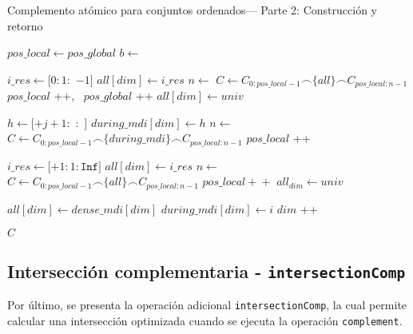 \begin{algorithm}
\caption{Complemento atómico para conjuntos ordenados— Parte 2: Construcción y retorno}\label{alg:complementAtom-part2}
\begin{algorithmic}[1]
    \State $pos\_local \gets pos\_global$
    \State $b \gets$ 


      \State $i\_res \gets [0:1:$ $-1]$
        \State $all[dim] \gets i\_res$
        \State $n \gets$ 
        \State $C \gets C_{0:pos\_local - 1} \frown \{all\} \frown C_{pos\_local:n - 1}$
        \State $pos\_local$ \!+\!+, \, $pos\_global$ \!+\!+
        \State $all[dim] \gets univ$
      \EndIf
    \EndIf

            \State $h \gets [$$ + j + 1 : $ $: $ $]$
              \State $during\_mdi[dim] \gets h$
              \State $n \gets$ 
              \State $C \gets C_{0: pos\_local - 1} \frown \{during\_mdi\} \frown C_{pos\_local:n - 1}$
              \State $pos\_local$ \!+\!+
            \EndIf
          \EndFor
        \EndIf
    \EndIf

      \State $i\_res \gets [$$+1 : 1 : \texttt{Inf}]$
        \State $all[dim] \gets i\_res$
        \State $n \gets$ 
        \State $C \gets C_{0:pos\_local - 1} \frown \{all\} \frown C_{pos\_local:n - 1}$
        \State $pos\_local \!+\!+$
        \State $all_{dim} \gets univ$
      \EndIf
    \EndIf

    \State $all[dim] \gets dense\_mdi[dim]$
    \State $during\_mdi[dim] \gets i$
    \State $dim$ \!+\!+
  \EndFor

  \State \Return $C$
\EndFunction
\end{algorithmic}
\end{algorithm}


\newpage
\subsection{Intersección complementaria - \texttt{intersectionComp}}

Por último, se presenta la operación adicional \texttt{intersectionComp}, la cual permite calcular una intersección optimizada cuando se ejecuta la operación \texttt{complement}.


